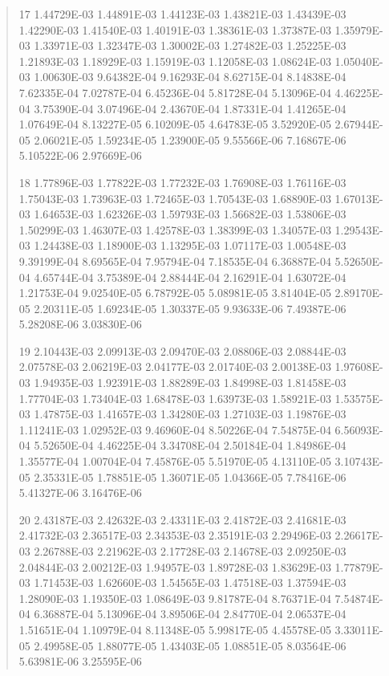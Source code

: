 \documentclass[letterpaper,10pt,english]{sphinxmanual}
\begin{document}
\begin{quote}
\begin{DUlineblock}{0em}
\item[] 17   1.44729E-03  1.44891E-03  1.44123E-03  1.43821E-03  1.43439E-03  1.42290E-03  1.41540E-03  1.40191E-03  1.38361E-03  1.37387E-03  1.35979E-03  1.33971E-03  1.32347E-03  1.30002E-03  1.27482E-03  1.25225E-03  1.21893E-03  1.18929E-03  1.15919E-03  1.12058E-03  1.08624E-03  1.05040E-03  1.00630E-03  9.64382E-04  9.16293E-04  8.62715E-04  8.14838E-04  7.62335E-04  7.02787E-04  6.45236E-04  5.81728E-04  5.13096E-04  4.46225E-04  3.75390E-04  3.07496E-04  2.43670E-04  1.87331E-04  1.41265E-04  1.07649E-04  8.13227E-05  6.10209E-05  4.64783E-05  3.52920E-05  2.67944E-05  2.06021E-05  1.59234E-05  1.23900E-05  9.55566E-06  7.16867E-06  5.10522E-06  2.97669E-06
\item[] 18   1.77896E-03  1.77822E-03  1.77232E-03  1.76908E-03  1.76116E-03  1.75043E-03  1.73963E-03  1.72465E-03  1.70543E-03  1.68890E-03  1.67013E-03  1.64653E-03  1.62326E-03  1.59793E-03  1.56682E-03  1.53806E-03  1.50299E-03  1.46307E-03  1.42578E-03  1.38399E-03  1.34057E-03  1.29543E-03  1.24438E-03  1.18900E-03  1.13295E-03  1.07117E-03  1.00548E-03  9.39199E-04  8.69565E-04  7.95794E-04  7.18535E-04  6.36887E-04  5.52650E-04  4.65744E-04  3.75389E-04  2.88444E-04  2.16291E-04  1.63072E-04  1.21753E-04  9.02540E-05  6.78792E-05  5.08981E-05  3.81404E-05  2.89170E-05  2.20311E-05  1.69234E-05  1.30337E-05  9.93633E-06  7.49387E-06  5.28208E-06  3.03830E-06
\item[] 19   2.10443E-03  2.09913E-03  2.09470E-03  2.08806E-03  2.08844E-03  2.07578E-03  2.06219E-03  2.04177E-03  2.01740E-03  2.00138E-03  1.97608E-03  1.94935E-03  1.92391E-03  1.88289E-03  1.84998E-03  1.81458E-03  1.77704E-03  1.73404E-03  1.68478E-03  1.63973E-03  1.58921E-03  1.53575E-03  1.47875E-03  1.41657E-03  1.34280E-03  1.27103E-03  1.19876E-03  1.11241E-03  1.02952E-03  9.46960E-04  8.50226E-04  7.54875E-04  6.56093E-04  5.52650E-04  4.46225E-04  3.34708E-04  2.50184E-04  1.84986E-04  1.35577E-04  1.00704E-04  7.45876E-05  5.51970E-05  4.13110E-05  3.10743E-05  2.35331E-05  1.78851E-05  1.36071E-05  1.04366E-05  7.78416E-06  5.41327E-06  3.16476E-06
\item[] 20   2.43187E-03  2.42632E-03  2.43311E-03  2.41872E-03  2.41681E-03  2.41732E-03  2.36517E-03  2.34353E-03  2.35191E-03  2.29496E-03  2.26617E-03  2.26788E-03  2.21962E-03  2.17728E-03  2.14678E-03  2.09250E-03  2.04844E-03  2.00212E-03  1.94957E-03  1.89728E-03  1.83629E-03  1.77879E-03  1.71453E-03  1.62660E-03  1.54565E-03  1.47518E-03  1.37594E-03  1.28090E-03  1.19350E-03  1.08649E-03  9.81787E-04  8.76371E-04  7.54874E-04  6.36887E-04  5.13096E-04  3.89506E-04  2.84770E-04  2.06537E-04  1.51651E-04  1.10979E-04  8.11348E-05  5.99817E-05  4.45578E-05  3.33011E-05  2.49958E-05  1.88077E-05  1.43403E-05  1.08851E-05  8.03564E-06  5.63981E-06  3.25595E-06

\end{DUlineblock}
\end{quote}
\end{document}
